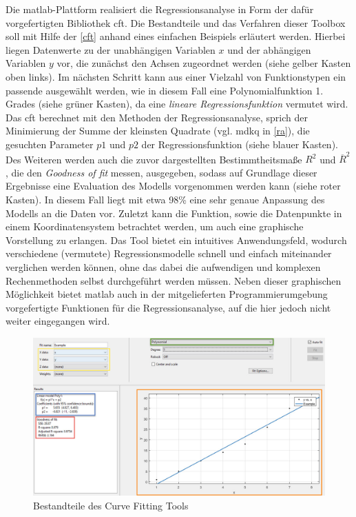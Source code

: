 Die \gls{matlab}-Plattform realisiert die Regressionsanalyse in Form der dafür vorgefertigten Bibliothek \gls{cft}. Die Bestandteile und das Verfahren dieser Toolbox soll mit Hilfe der \vref{cft} anhand eines einfachen Beispiels erläutert werden. Hierbei liegen Datenwerte zu der unabhängigen Variablen $x$ und der abhängigen Variablen $y$ vor, die zunächst den Achsen zugeordnet werden (siehe gelber Kasten oben links). Im nächsten Schritt kann aus einer Vielzahl von Funktionstypen ein passende ausgewählt werden, wie in diesem Fall eine Polynomialfunktion 1. Grades (siehe grüner Kasten), da eine \textit{lineare Regressionsfunktion} vermutet wird. Das \gls{cft} berechnet mit den Methoden der Regressionsanalyse, sprich der Minimierung der Summe der kleinsten Quadrate (vgl. \gls{mdkq} in \vref{ra}), die gesuchten Parameter $p1$ und $p2$ der Regressionsfunktion (siehe blauer Kasten). Des Weiteren werden auch die zuvor dargestellten Bestimmtheitsmaße $R^2$ und $\overline{R}^2$, die den \textit{Goodness of fit} messen, ausgegeben, sodass auf Grundlage dieser Ergebnisse eine Evaluation des Modells vorgenommen werden kann (siehe roter Kasten). In diesem Fall liegt mit etwa 98\% eine sehr genaue Anpassung des Modells an die Daten vor. Zuletzt kann die Funktion, sowie die Datenpunkte in einem Koordinatensystem betrachtet werden, um auch eine graphische Vorstellung zu erlangen. Das Tool bietet ein intuitives Anwendungsfeld, wodurch verschiedene (vermutete) Regressionsmodelle schnell und einfach miteinander verglichen werden können, ohne das dabei die aufwendigen und komplexen Rechenmethoden selbst durchgeführt werden müssen. Neben dieser graphischen Möglichkeit bietet \gls{matlab} auch in der mitgelieferten Programmierumgebung vorgefertigte Funktionen für die Regressionsanalyse, auf die hier jedoch nicht weiter eingegangen wird.

\begin{figure}
\centering
\includegraphics[scale=0.675]{se-wa-jpg/cft}
\caption[Bestandteile des Curve Fitting Tools]{Bestandteile des Curve Fitting Tools\protect\footnotemark}
\label{cft}
\end{figure}
